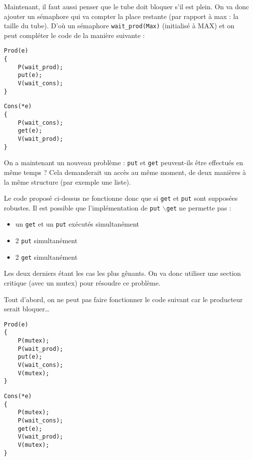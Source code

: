 \documentclass[12pt,a4paper]{report}
\begin{document}
Maintenant, il faut aussi penser que le tube doit bloquer s'il est plein. On va donc ajouter un sémaphore qui va compter la place restante (par rapport à max : la taille du tube). D'où un sémaphore \verb?wait_prod(Max)? (initialisé à MAX) et on peut compléter le code de la manière suivante :

\medskip

\begin{minipage}{0.5\linewidth}
\begin{verbatim}
Prod(e)
{
    P(wait_prod);
    put(e);
    V(wait_cons);
}
\end{verbatim}
\end{minipage}
\begin{minipage}{0.5\linewidth}
\begin{verbatim}
Cons(*e)
{
    P(wait_cons);
    get(e);
    V(wait_prod);
}
\end{verbatim}
\end{minipage}

\medskip

On a maintenant un nouveau problème : \verb?put? et \verb?get? peuvent-ils être effectués en même temps ? Cela demanderait un accès au même moment, de deux manières à la même structure (par exemple une liste).

Le code proposé ci-dessus ne fonctionne donc que si \verb?get? et \verb?put? sont supposées robustes. Il est possible que l'implémentation de \verb?put? $\backslash$\verb?get? ne permette pas :
\begin{itemize}
\item un \verb?get? et un \verb?put? exécutés simultanément
\item 2 \verb?put? simultanément
\item 2 \verb?get? simultanément\\
\end{itemize}

Les deux derniers étant les cas les plus gênants. On va donc utiliser une section critique (avec un mutex) pour résoudre ce problème.

Tout d'abord, on ne peut pas faire fonctionner le code suivant car le producteur serait bloquer\dots

\medskip

\begin{minipage}{0.5\linewidth}
\begin{verbatim}
Prod(e)
{
    P(mutex);
    P(wait_prod);
    put(e);
    V(wait_cons);
    V(mutex);
}
\end{verbatim}
\end{minipage}
\begin{minipage}{0.5\linewidth}
\begin{verbatim}
Cons(*e)
{
    P(mutex);
    P(wait_cons);
    get(e);
    V(wait_prod);
    V(mutex);
}
\end{verbatim}
\end{minipage}
\end{document}
